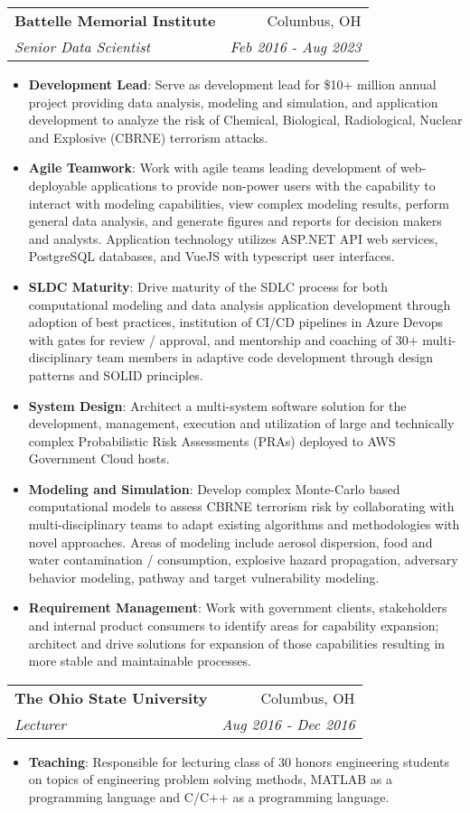 \documentclass[letterpaper,11pt]{article}
\makeatletter
\newcommand{\resumeItem}[2]{
  \item\small{
    \textbf{#1}{: #2 \vspace{-2pt}}
  }
}
\newcommand{\resumeSubheading}[4]{
  \vspace{-1pt}\item
    \begin{tabular*}{0.97\textwidth}[t]{l@{\extracolsep{\fill}}r}
      \textbf{#1} & #2 \\
      \textit{\small#3} & \textit{\small #4} \\
    \end{tabular*}\vspace{-5pt}
}
\newcommand{\resumeItemListStart}{\begin{itemize}}
\newcommand{\resumeItemListEnd}{\end{itemize}\vspace{-5pt}}
\makeatother
\begin{document}
    \resumeSubheading
      {Battelle Memorial Institute}{Columbus, OH}
      {Senior Data Scientist}{Feb 2016 - Aug 2023}
      \resumeItemListStart
        \resumeItem{Development Lead}
          {Serve as development lead for \$10+ million annual project providing data analysis, modeling and simulation, and application development to analyze the risk of Chemical, Biological, Radiological, Nuclear and Explosive (CBRNE) terrorism attacks.}
        \resumeItem{Agile Teamwork}
          {Work with agile teams leading development of web-deployable applications to provide non-power users with the capability to interact with modeling capabilities, view complex modeling results, perform general data analysis, and generate figures and reports for decision makers and analysts. Application technology utilizes ASP.NET API web services, PostgreSQL databases, and VueJS with typescript user interfaces. }
        \resumeItem{SLDC Maturity}
          {Drive maturity of the SDLC process for both computational modeling and data analysis application development through adoption of best practices, institution of CI/CD pipelines in Azure Devops with gates for review / approval, and mentorship and coaching of 30+ multi-disciplinary team members in adaptive code development through design patterns and SOLID principles.}
        \resumeItem{System Design}
          {Architect a multi-system software solution for the development, management, execution and utilization of large and technically complex Probabilistic Risk Assessments (PRAs) deployed to AWS Government Cloud hosts.}
        \resumeItem{Modeling and Simulation}
          {Develop complex Monte-Carlo based computational models to assess CBRNE terrorism risk by collaborating with multi-disciplinary teams to adapt existing algorithms and methodologies with novel approaches. Areas of modeling include aerosol dispersion, food and water contamination / consumption, explosive hazard propagation, adversary behavior modeling, pathway and target vulnerability modeling.}
        \resumeItem{Requirement Management}
          {Work with government clients, stakeholders and internal product consumers to identify areas for capability expansion; architect and drive solutions for expansion of those capabilities resulting in more stable and maintainable processes.}
      \resumeItemListEnd

    \resumeSubheading
      {The Ohio State University}{Columbus, OH}
      {Lecturer}{Aug 2016 - Dec 2016}
      \resumeItemListStart
        \resumeItem{Teaching}
          {Responsible for lecturing class of 30 honors engineering students on topics of engineering problem solving methods, MATLAB as a programming language and C/C++ as a programming language.}
      \resumeItemListEnd
\end{document}
